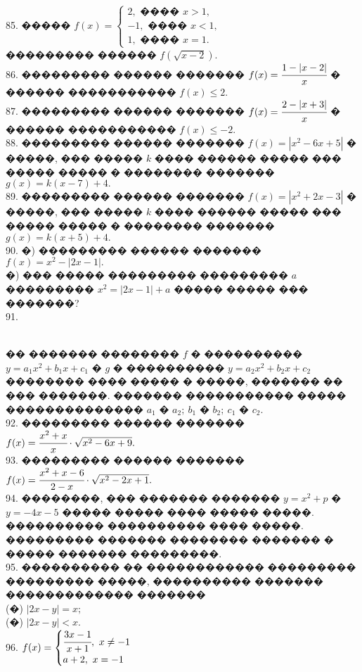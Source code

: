 \documentclass[12pt]{article}
\begin{document}
85. ����� $f(x)=\begin{cases} 2, \text{ ���� } x>1,\\ -1, \text{ ���� } x<1,\\ 1, \text{ ���� } x=1.\end{cases}$\\
��������� ������ $f(\sqrt{x-2}).$\\
86. ��������� ������ ������� $f(x)=\cfrac{1-|x-2|}{x}$ � ������ ����������� $f(x)\leqslant 2.$\\
87. ��������� ������ ������� $f(x)=\cfrac{2-|x+3|}{x}$ � ������ ����������� $f(x)\leqslant -2.$\\
88. ��������� ������ ������� $f(x)=|x^2-6x+5|$ � �����, ��� ����� $k$ ���� ������ ����� ��� ����� ����� � �������� ������� $g(x)=k(x-7)+4.$\\
89. ��������� ������ ������� $f(x)=|x^2+2x-3|$ � �����, ��� ����� $k$ ���� ������ ����� ��� ����� ����� � �������� ������� $g(x)=k(x+5)+4.$\\
90. �) ��������� ������ ������� $f(x)=x^2-|2x-1|.$\\
�) ��� ����� ��������� ��������� $a$ ��������� $x^2=|2x-1|+a$ ����� ����� ��� �������?\\
91. \begin{figure}[ht!]
\end{figure}\\
�� ������� �������� $f$ � ���������� $y=a_1 x^2+b_1x+c_1$ � $g$ � ���������� $y=a_2 x^2+b_2x+c_2$ �������� ���� ����� � �����, ������� �� ��� �������. ������� ����������� ����� �������������� $a_1$ � $a_2;\ b_1$ � $b_2;\ c_1$ � $c_2.$\\
92. ��������� ������ ������� $f(x)=\cfrac{x^2+x}{x}\cdot\sqrt{x^2-6x+9}.$\\
93. ��������� ������ ������� $f(x)=\cfrac{x^2+x-6}{2-x}\cdot\sqrt{x^2-2x+1}.$\\
94. ��������, ��� ������� ������� $y=x^2+p$ � $y=-4x-5$ ����� ����� ���� ����� �����. ���������� ���������� ���� �����. ��������� ������� �������� ������� � ����� ������� ���������.\\
95. ���������� �� ������������ ��������� ��������� �����, ���������� ������� ������������� �������\\
(�) $|2x-y|=x;$\\
(�) $|2x-y|<x.$\\
96. $f(x)=\begin{cases} \cfrac{3x-1}{x+1},\ x\neq-1\\a+2,\ x=-1 \end{cases}$\\
\end{document}
